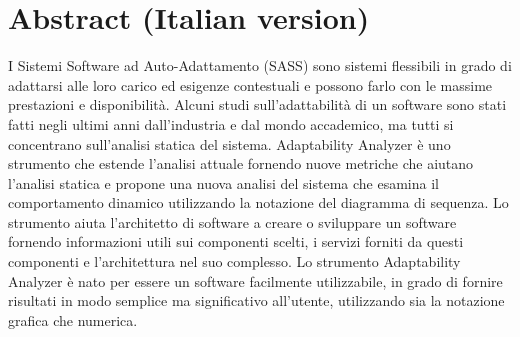 {}
\chapter*{Abstract (Italian version)}
\lettrine{I}{} Sistemi Software ad Auto-Adattamento (SASS) sono sistemi flessibili in grado di adattarsi alle loro carico ed esigenze contestuali e possono farlo con le massime prestazioni e disponibilità.
\newline
\newline
\indent Alcuni studi sull'adattabilità di un software sono stati fatti negli ultimi anni dall'industria e dal mondo accademico, ma tutti si concentrano sull'analisi statica del sistema.
\newline
\newline
\indent Adaptability Analyzer è uno strumento che estende l'analisi attuale fornendo nuove metriche che aiutano l'analisi statica e propone una nuova analisi del sistema che esamina il comportamento dinamico utilizzando la notazione del diagramma di sequenza.
\newline
\newline
\indent Lo strumento aiuta l'architetto di software a creare o sviluppare un software fornendo informazioni utili sui componenti scelti, i servizi forniti da questi componenti e l'architettura nel suo complesso.
\newline
\newline
\indent Lo strumento Adaptability Analyzer è nato per essere un software facilmente utilizzabile, in grado di fornire risultati in modo semplice ma significativo all'utente, utilizzando sia la notazione grafica che numerica.

\cleardoublepage
{}
{}
